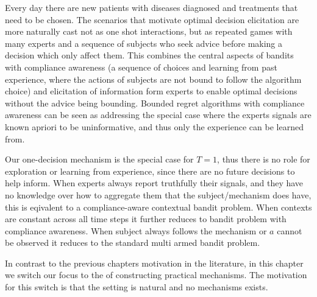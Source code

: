 



Every day there are new patients with diseases diagnosed and treatments that need to be chosen. 
The scenarios that motivate optimal decision elicitation are more naturally cast not as one shot interactions, but as repeated games with many experts and a sequence of subjects who seek advice before making a decision which only affect them.
This combines the central aspects of bandits with compliance awareness (a sequence of choices and learning from past experience, where the actions of subjects are not bound to follow the algorithm choice) and elicitation of information form experts to enable optimal decisions without the advice being bounding. 
Bounded regret algorithms with compliance awareness can be seen as addressing the special case where the experts signals are known apriori to be uninformative, and thus only the experience can be learned from.

Our one-decision mechanism is the special case for $T={1}$, thus there is no role for exploration or learning from experience, since there are no future decisions  to help inform.
When experts always report truthfully their signals, and they have no knowledge over how to aggregate them that the subject/mechanism does have,  this is eqivalent to a compliance-aware contextual bandit problem. 
When contexts are constant across all time steps it further reduces to bandit problem with compliance awareness.
When subject always follows the mechanism or $a$ cannot be observed it reduces to the standard multi armed bandit problem. 

 
In contrast to the previous chapters motivation in the literature, in this chapter we switch our focus to the of constructing practical mechanisms. 
The motivation for this switch is that the setting is natural and no mechanisms exists. 


